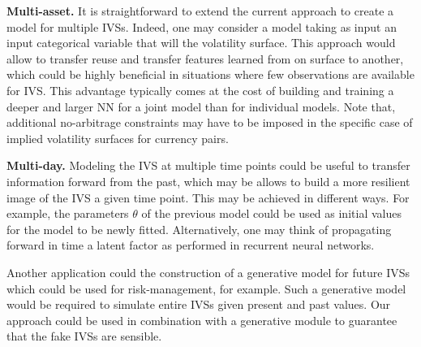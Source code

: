 \textbf{Multi-asset.}
It is straightforward to extend the current approach to create a model for multiple IVSs.
Indeed, one may consider a model taking as input an input categorical variable that will the volatility surface.
This approach would allow to transfer reuse and transfer features learned from on surface to another, which could be highly beneficial in situations where few observations are available for IVS.
This advantage typically comes at the cost of building and training a deeper and larger NN for a joint model than for individual models.
Note that, additional no-arbitrage constraints may have to be imposed in the specific case of implied volatility surfaces for currency pairs.

\textbf{Multi-day.}
Modeling the IVS at multiple time points could be useful to transfer information forward from the past, which may be allows to build a more resilient image of the IVS a given time point.
This may be achieved in different ways.
For example, the parameters $\theta$ of the previous model could be used as initial values for the model to be newly fitted.
Alternatively, one may think of propagating forward in time a latent factor as performed in recurrent neural networks.

Another application could the construction of a generative model for future IVSs which could be used for risk-management, for example.
Such a generative model would be required to simulate entire IVSs given present and past values.
Our approach could be used in combination with a generative module to guarantee that the fake IVSs are sensible.